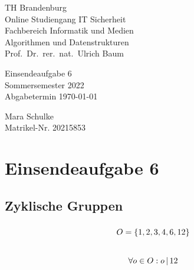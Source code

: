 \documentclass{article}
\begin{document}
\begin{titlepage}
	\begin{flushleft}
		TH Brandenburg\\
		Online Studiengang IT Sicherheit\\
		Fachbereich Informatik und Medien\\
		Algorithmen und Datenstrukturen\\
		Prof.\ Dr.\ rer.\ nat.\ Ulrich Baum
	\end{flushleft}

	\vfill

	\begin{center}
		\Large{Einsendeaufgabe 6}\\[0.5em]
		\large{Sommersemester 2022}\\[0.25em]
		\large{Abgabetermin \today}
	\end{center}

	\vfill

	\begin{flushright}
		Mara Schulke \\
		Matrikel-Nr. 20215853
	\end{flushright}
\end{titlepage}

\newpage

\section*{Einsendeaufgabe 6}

\subsection{Zyklische Gruppen}

\subsubsection{}

\begin{gather*}
	O = \{1, 2, 3, 4, 6, 12\}\\
	\vspace{0.5em}\\
	\forall o \in O: o\, |\, 12
\end{gather*}

\subsubsection{}
\end{document}
